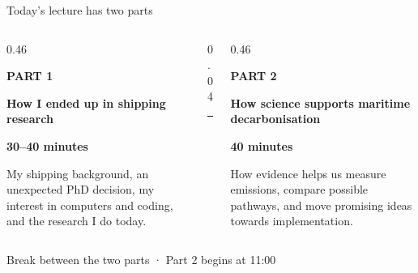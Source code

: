 \documentclass[aspectratio=169,11pt]{beamer}
\newcommand{\partlabel}[1]{%
  {\color{Navy}\fontsize{9}{11}\selectfont\bfseries\MakeUppercase{#1}\par}
}
\begin{document}
\begin{frame}{Today’s lecture has two parts}
  \vspace{0.22cm}
  \begin{columns}[T,onlytextwidth]
    \begin{column}{0.46\textwidth}
      \partlabel{Part 1}
      \vspace{0.22cm}
      {\color{Ink}\fontsize{16}{19}\selectfont\bfseries
        How I ended up in shipping research
      \par}
      \vspace{0.13cm}
      {\color{Navy}\fontsize{10.5}{13}\selectfont\bfseries 30–40 minutes\par}
      \vspace{0.34cm}
      {\color{Ink}\fontsize{11.5}{15.5}\selectfont
        My shipping background, an unexpected PhD decision, my interest in
        computers and coding, and the research I do today.
      \par}
    \end{column}

    \begin{column}{0.04\textwidth}
      \centering
      {\color{RuleGray}\rule{0.6pt}{3.45cm}}
    \end{column}

    \begin{column}{0.46\textwidth}
      \partlabel{Part 2}
      \vspace{0.22cm}
      {\color{Ink}\fontsize{16}{19}\selectfont\bfseries
        How science supports maritime decarbonisation
      \par}
      \vspace{0.13cm}
      {\color{Navy}\fontsize{10.5}{13}\selectfont\bfseries 40 minutes\par}
      \vspace{0.34cm}
      {\color{Ink}\fontsize{11.5}{15.5}\selectfont
        How evidence helps us measure emissions, compare possible pathways,
        and move promising ideas towards implementation.
      \par}
    \end{column}
  \end{columns}

  \vfill
  {\color{Muted}\fontsize{8.5}{10.5}\selectfont
    Break between the two parts · Part 2 begins at 11:00
  \par}
\end{frame}
\end{document}
